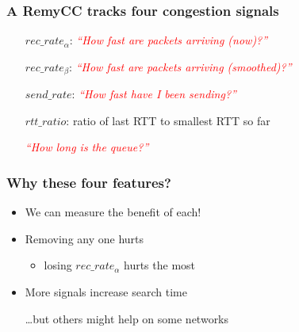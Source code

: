 \documentclass[svgnames]{beamer}
\begin{document}
\begin{frame}
\frametitle{A RemyCC tracks four congestion signals}

\large

\hspace{0.5 cm}\begin{minipage}{10.0 cm}
\begin{itemize}

\item[$rec\_rate_\alpha$:] \textcolor{Red}{\textit{``How fast are packets arriving (now)?''}}

\item[$rec\_rate_\beta$:] \textcolor{Red}{\textit{``How fast are packets arriving (smoothed)?''}}

\item[]

\item[$send\_rate$:] \textcolor{Red}{\textit{``How fast have I been sending?''}}

\item[]

\item[$rtt\_ratio$:] ratio of last RTT to smallest RTT so far

\textcolor{Red}{\textit{``How long is the queue?''}}

\end{itemize}
\end{minipage}

\end{frame}

\begin{frame}
\frametitle{Why these four features?}

\Large

\begin{itemize}

\item We can measure the benefit of each!

\item[]

\item Removing any one hurts

\begin{itemize}
\item losing $rec\_rate_\alpha$ hurts the most
\end{itemize}

\item[]

\item More signals increase search time

\item[]

\item[] \ldots but others might help on some networks

\end{itemize}

\end{frame}
\end{document}
